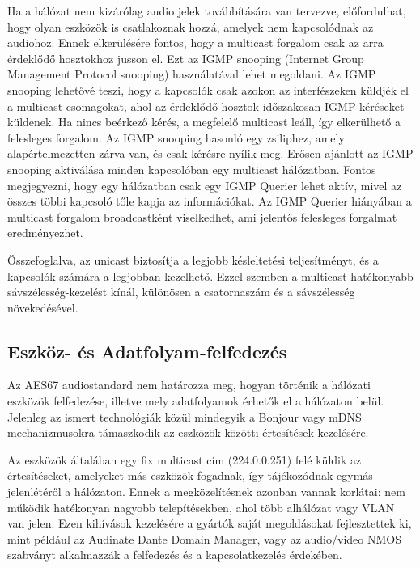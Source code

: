 Ha a hálózat nem kizárólag audio jelek továbbítására van tervezve, előfordulhat, hogy olyan 
eszközök is csatlakoznak hozzá, amelyek nem kapcsolódnak az audiohoz. Ennek elkerülésére fontos, hogy 
a multicast forgalom csak az arra érdeklődő hosztokhoz jusson el. Ezt az IGMP snooping 
(Internet Group Management Protocol snooping) használatával lehet megoldani. 
Az IGMP snooping lehetővé teszi, hogy a kapcsolók csak azokon az interfészeken küldjék el a 
multicast csomagokat, ahol az érdeklődő hosztok időszakosan IGMP kéréseket küldenek. 
Ha nincs beérkező kérés, a megfelelő multicast leáll, így elkerülhető a felesleges forgalom. 
Az IGMP snooping hasonló egy zsiliphez, amely alapértelmezetten zárva van, és csak kérésre nyílik meg. 
Erősen ajánlott az IGMP snooping aktiválása minden kapcsolóban egy multicast hálózatban. 
Fontos megjegyezni, hogy egy hálózatban csak egy IGMP Querier lehet aktív, mivel az összes 
többi kapcsoló tőle kapja az információkat. Az IGMP Querier hiányában a multicast forgalom 
broadcastként viselkedhet, ami jelentős felesleges forgalmat eredményezhet.

Összefoglalva, az unicast biztosítja a legjobb késleltetési teljesítményt, és a kapcsolók 
számára a legjobban kezelhető. Ezzel szemben a multicast hatékonyabb sávszélesség-kezelést 
kínál, különösen a csatornaszám és a sávszélesség növekedésével.

\subsection{Eszköz- és Adatfolyam-felfedezés}

Az AES67 audiostandard nem határozza meg, hogyan történik a hálózati eszközök felfedezése, illetve mely 
adatfolyamok érhetők el a hálózaton belül. Jelenleg az ismert technológiák közül mindegyik a Bonjour 
vagy mDNS mechanizmusokra támaszkodik az eszközök közötti értesítések kezelésére.

Az eszközök általában egy fix multicast cím (224.0.0.251) felé küldik az értesítéseket, amelyeket más 
eszközök fogadnak, így tájékozódnak egymás jelenlétéről a hálózaton. 
Ennek a megközelítésnek azonban vannak korlátai: nem működik hatékonyan nagyobb telepítésekben, ahol 
több alhálózat vagy VLAN van jelen. Ezen kihívások kezelésére a gyártók saját megoldásokat 
fejlesztettek ki, mint például az Audinate Dante Domain Manager, vagy az audio/video NMOS 
szabványt alkalmazzák a felfedezés és a kapcsolatkezelés érdekében.

